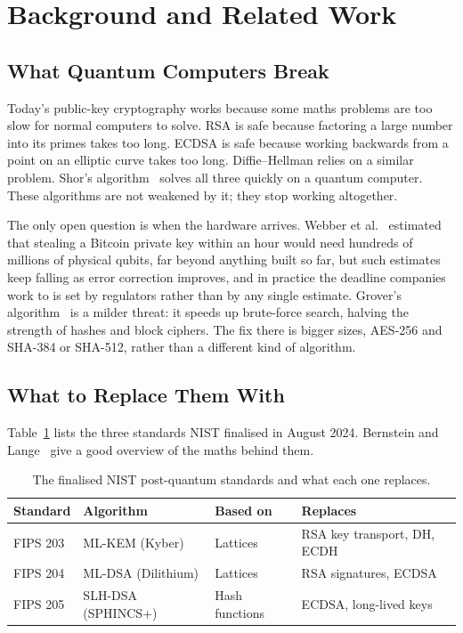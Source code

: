 \documentclass[runningheads]{llncs}
\begin{document}
\section{Background and Related Work}
\label{sec:background}

\subsection{What Quantum Computers Break}

Today's public-key cryptography works because some maths problems are too slow
for normal computers to solve. RSA is safe because factoring a large number
into its primes takes too long. ECDSA is safe because working backwards from a
point on an elliptic curve takes too long. Diffie--Hellman relies on a similar
problem. Shor's algorithm~\cite{shor1997} solves all three quickly on a quantum
computer. These algorithms are not weakened by it; they stop working
altogether.

The only open question is when the hardware arrives. Webber et
al.~\cite{webber2022} estimated that stealing a Bitcoin private key within an
hour would need hundreds of millions of physical qubits, far beyond anything
built so far, but such estimates keep falling as error correction improves, and
in practice the deadline companies work to is set by regulators rather than by
any single estimate. Grover's algorithm~\cite{grover1996} is a milder threat: it
speeds up brute-force search, halving the strength of hashes and block ciphers.
The fix there is bigger sizes, AES-256 and SHA-384 or SHA-512, rather than a
different kind of algorithm.

\subsection{What to Replace Them With}

Table~\ref{tab:nist} lists the three standards NIST finalised in August 2024.
Bernstein and Lange~\cite{bernstein2017} give a good overview of the maths
behind them.

\begin{table}[t]
\centering
\caption{The finalised NIST post-quantum standards and what each one replaces.}
\label{tab:nist}
\begin{tabular}{@{}llll@{}}
\toprule
\textbf{Standard} & \textbf{Algorithm} & \textbf{Based on} & \textbf{Replaces} \\
\midrule
FIPS 203 & ML-KEM (Kyber)      & Lattices       & RSA key transport, DH, ECDH \\
FIPS 204 & ML-DSA (Dilithium)  & Lattices       & RSA signatures, ECDSA \\
FIPS 205 & SLH-DSA (SPHINCS+)  & Hash functions & ECDSA, long-lived keys \\
\bottomrule
\end{tabular}
\end{table}
\end{document}
